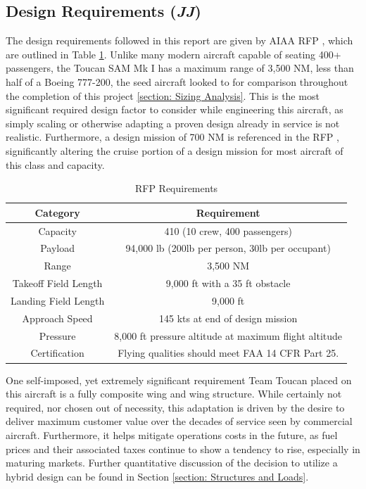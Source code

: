 \subsection{Design Requirements (\textit{JJ})}
The design requirements followed in this report are given by AIAA RFP \cite{RFP}, which are outlined in Table \ref{uno}.  Unlike many modern aircraft capable of seating 400+ passengers, the Toucan SAM Mk I has a maximum range of 3,500 NM, less than half of a Boeing 777-200, the seed aircraft looked to for comparison throughout the completion of this project \ref{section: Sizing Analysis}.  This is the most significant required design factor to consider while engineering this aircraft, as simply scaling or otherwise adapting a proven design already in service is not realistic.  Furthermore, a design mission of 700 NM is referenced in the RFP \cite{RFP}, significantly altering the cruise portion of a design mission for most aircraft of this class and capacity.  

\begin{table}[h!] 
    \centering
    \caption{RFP Requirements}
    \begin{tabular}{ |c||c| }\toprule
    \textbf{Category} & \textbf{Requirement} \\\hline\hline
    Capacity & 410 (10 crew, 400 passengers) \\\hline
    Payload & 94,000 lb (200lb per person, 30lb per occupant) \\\hline
    Range & 3,500 NM \\\hline
    Takeoff Field Length & 9,000 ft with a 35 ft obstacle \\\hline
    Landing Field Length & 9,000 ft \\\hline
    Approach Speed & 145 kts at end of design mission\\\hline
    Pressure & 8,000 ft pressure altitude at maximum flight altitude \\\hline
    Certification & Flying qualities should meet FAA 14 CFR Part 25.\\\hline 

    \end{tabular}\label{uno}
\end{table}

One self-imposed, yet extremely significant requirement Team Toucan placed on this aircraft is a fully composite wing and wing structure. While certainly not required, nor chosen out of necessity, this adaptation is driven by the desire to deliver maximum customer value over the decades of service seen by commercial aircraft.  Furthermore, it helps mitigate operations costs in the future, as fuel prices and their associated taxes continue to show a tendency to rise, especially in maturing markets.  Further quantitative discussion of the decision to utilize a hybrid design can be found in Section \ref{section: Structures and Loads}.
\clearpage
